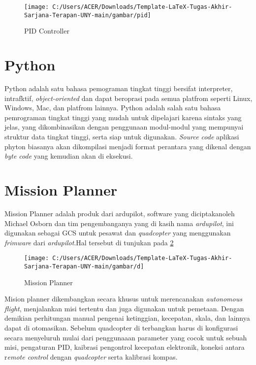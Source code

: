 \begin{figure}[H]
	\centering
	\texttt{[image: C:/Users/ACER/Downloads/Template-LaTeX-Tugas-Akhir-Sarjana-Terapan-UNY-main/gambar/pid]}
	\caption{PID Controller}
	\label{fig:pid}
\end{figure}

\section{Python}
Python adalah satu bahasa pemograman tingkat tinggi bersifat interpreter, intrafktif, \textit{object-oriented} dan dapat beroprasi pada semua platfrom seperti Linux, Windows, Mac, dan platfrom lainnya. Python adalah salah satu bahasa pemrograman tingkat tinggi yang mudah untuk dipelajari karena sintaks yang jelas, yang dikombinasikan dengan penggunaan modul-modul yang mempunyai struktur data tingkat tinggi, serta siap untuk digunakan. \textit{Source code} aplikasi phyton biasanya akan dikompilasi menjadi format perantara yang dikenal dengan \textit{byte code} yang kemudian akan di eksekusi\cite{ratna2020pengolahan}.


\section{Mission Planner}
Mission Planner adalah produk dari ardupilot, software yang diciptakanoleh Michael Osborn dan tim pengembanganya yang di kasih nama \textit{ardupilot}, ini digunakan sebagai GCS untuk pesawat dan \textit{quadcopter} yang menggunakan \textit{frimware} dari \textit{ardupilot}\cite{kurniawan2022pengembangan}.Hal tersebut di tunjukan pada \cref{fig:d}

\begin{figure}[H]
	\centering
	\texttt{[image: C:/Users/ACER/Downloads/Template-LaTeX-Tugas-Akhir-Sarjana-Terapan-UNY-main/gambar/d]}
	\caption{Mission Planner}
	\label{fig:d}
\end{figure}

Mision planner dikembangkan secara khusus untuk merencanakan \textit{autonomous flight}, menjalankan misi tertentu dan juga digunakan untuk pemetaan. Dengan demikian perhitungan manual pengenai ketinggian, kecepatan, skala, dan lainnya dapat di otomasikan. Sebelum quadcopter di terbangkan harus di konfigurasi secara menyeluruh mulai dari penggunaaan parameter yang cocok untuk sebuah misi, pengaturan PID, kaibrasi pengontrol kecepatan elektronik, koneksi antara r\textit{emote control} dengan \textit{quadcopter} serta kalibrasi kompas.